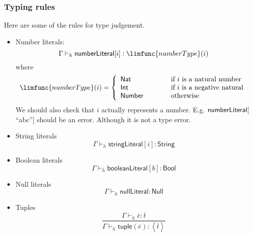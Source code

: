 \documentclass[12pt]{article}
\begin{document}
\subsubsection{Typing rules}

Here are some of the rules for type judgement.

\begin{itemize}
\item Number literals:$\ $%
\begin{equation*}
\Gamma \vdash _{h}\mathsf{numberLiteral}[i]:\limfunc{numberType}(i)
\end{equation*}%
where%
\begin{equation*}
\limfunc{numberType}(i)=\left\{ 
\begin{array}{lll}
\mathsf{Nat} & \qquad  & \text{if }i\text{ is a natural number} \\ 
\mathsf{Int} &  & \text{if }i\text{ is a negative natural} \\ 
\mathsf{Number} &  & \text{otherwise}%
\end{array}%
\right. 
\end{equation*}%
We should also check that $i$ actually represents a number. E.g. $\mathsf{%
numberLiteral}[$\textquotedblleft abc\textquotedblright $]$ should be an
error. Although it is not a type error.

\item String literals 
\begin{equation*}
\Gamma \vdash _{h}\mathsf{stringLiteral}[i]:\mathsf{String}
\end{equation*}

\item Boolean literals 
\begin{equation*}
\Gamma \vdash _{h}\mathsf{booleanLiteral}[b]:\mathsf{Bool}
\end{equation*}

\item Null literals%
\begin{equation*}
\Gamma \vdash _{h}\mathsf{nullLiteral}:\mathsf{Null}
\end{equation*}

\item Tuples%
\begin{equation*}
\frac{\Gamma \vdash _{h}\bar{e}:\bar{t}}{\Gamma \vdash _{h}\mathsf{tuple}%
\left( \bar{e}\right) :\left\langle \bar{t}\right\rangle }
\end{equation*}


\end{itemize}
\end{document}
